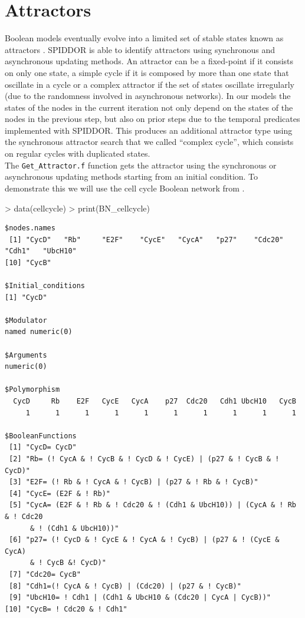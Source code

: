 \documentclass[a4paper]{article}
\begin{document}
\section{Attractors}
Boolean models eventually evolve into a limited set of stable states known as attractors \cite{Hopfensitz2012-pv}. SPIDDOR is able to identify attractors using synchronous and asynchronous updating methods. An attractor can be a fixed-point if it consists on only one state, a simple cycle if it is composed by more than one state that oscillate in a cycle or a complex attractor if the set of states oscillate irregularly (due to the randomness involved in asynchronous networks). In our models the states of the nodes in the current iteration not only depend on the states of the nodes in the previous step, but also on prior steps due to the temporal predicates implemented with SPIDDOR. This produces an additional attractor type using the synchronous attractor search that we called ``complex cycle'', which consists on regular cycles with duplicated states.
\\
The \texttt{Get\_Attractor.f} function gets the attractor using the synchronous or asynchronous updating methods starting from an initial condition. To demonstrate this we will use the cell cycle Boolean network from \cite{Faure2006-ha}.

\begin{Schunk}
\begin{Sinput}
> data(cellcycle)
> print(BN_cellcycle)
\end{Sinput}
\end{Schunk}
\begin{verbatim}
$nodes.names
 [1] "CycD"   "Rb"     "E2F"    "CycE"   "CycA"   "p27"    "Cdc20"  "Cdh1"   "UbcH10"
[10] "CycB"  

$Initial_conditions
[1] "CycD"

$Modulator
named numeric(0)

$Arguments
numeric(0)

$Polymorphism
  CycD     Rb    E2F   CycE   CycA    p27  Cdc20   Cdh1 UbcH10   CycB 
     1      1      1      1      1      1      1      1      1      1 

$BooleanFunctions
 [1] "CycD= CycD"                                                                                    
 [2] "Rb= (! CycA & ! CycB & ! CycD & ! CycE) | (p27 & ! CycB & ! CycD)"                             
 [3] "E2F= (! Rb & ! CycA & ! CycB) | (p27 & ! Rb & ! CycB)"                                         
 [4] "CycE= (E2F & ! Rb)"                                                                            
 [5] "CycA= (E2F & ! Rb & ! Cdc20 & ! (Cdh1 & UbcH10)) | (CycA & ! Rb & ! Cdc20 
      & ! (Cdh1 & UbcH10))"
 [6] "p27= (! CycD & ! CycE & ! CycA & ! CycB) | (p27 & ! (CycE & CycA) 
      & ! CycB &! CycD)"           
 [7] "Cdc20= CycB"                                                                                   
 [8] "Cdh1=(! CycA & ! CycB) | (Cdc20) | (p27 & ! CycB)"                                             
 [9] "UbcH10= ! Cdh1 | (Cdh1 & UbcH10 & (Cdc20 | CycA | CycB))"                                      
[10] "CycB= ! Cdc20 & ! Cdh1"
\end{verbatim}
\end{document}
